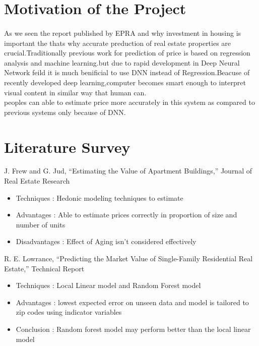 \documentclass[11pt,fleqn]{book} %
\begin{document}
\section{Motivation of the Project}  
\paragraph*{}  As we seen the report published by EPRA and why investment in  housing 
is important the thats why accurate preduction of real estate properties are crucial.Traditionally previous work for  prediction of price is based on regression analysis and machine learning.but due to rapid development in Deep Neural Network feild it is much benificial to use DNN instead of Regression.Beacuse of recently developed deep learning,computer becomes smart enough to interpret visual content in similar way that human can.\\
peoples can able to estimate price more accurately in this system as compared to previous systems only because of DNN.

\section{Literature Survey}
\begin{remark}
    J. Frew and G. Jud, “Estimating the Value of Apartment Buildings,” Journal of Real Estate Research
    \begin{itemize}
        \item Techniques : Hedonic modeling techniques to estimate
        \item Advantages : Able to estimate prices correctly in proportion of size and number of units
        \item Disadvantages : Effect of Aging isn't considered effectively
    \end{itemize}
\end{remark}

\begin{remark}
    R. E. Lowrance, “Predicting the Market Value of Single-Family Residential Real Estate,” Technical Report
    \begin{itemize}
        \item Techniques : Local Linear model and Random Forest model
        \item Advantages : lowest expected error on unseen data and model is tailored to zip codes using indicator variables
        \item Conclusion : Random forest model may perform better than the local linear model
    \end{itemize}
\end{remark}
\end{document}
